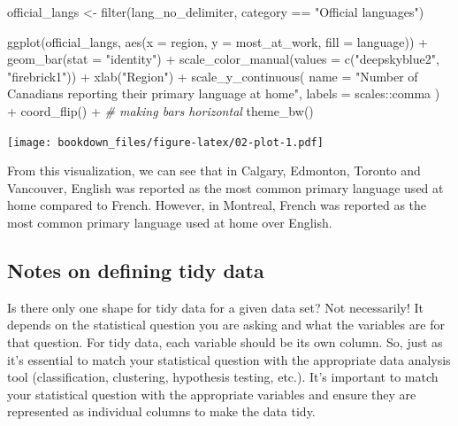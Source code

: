\documentclass[
]{krantz}
\makeatletter
\newenvironment{Shaded}{\begin{snugshade}}{\end{snugshade}}
\newcommand{\AttributeTok}[1]{\textcolor[rgb]{0.61,0.61,0.61}{#1}}
\newcommand{\CommentTok}[1]{\textcolor[rgb]{0.37,0.37,0.37}{\textit{#1}}}
\newcommand{\FunctionTok}[1]{\textcolor[rgb]{0,0,0}{#1}}
\newcommand{\NormalTok}[1]{#1}
\newcommand{\OtherTok}[1]{\textcolor[rgb]{0.37,0.37,0.37}{#1}}
\newcommand{\SpecialCharTok}[1]{\textcolor[rgb]{0,0,0}{#1}}
\newcommand{\StringTok}[1]{\textcolor[rgb]{0.5,0.5,0.5}{#1}}
\newenvironment{kframe}{%
\medskip{}
\setlength{\fboxsep}{.8em}
 \def\at@end@of@kframe{}%
 \ifinner\ifhmode%
  \def\at@end@of@kframe{\end{minipage}}%
  \begin{minipage}{\columnwidth}%
 \fi\fi%
 \def\FrameCommand##1{\hskip\@totalleftmargin \hskip-\fboxsep
 \colorbox{shadecolor}{##1}\hskip-\fboxsep
     \hskip-\linewidth \hskip-\@totalleftmargin \hskip\columnwidth}%
 \MakeFramed {\advance\hsize-\width
   \@totalleftmargin\z@ \linewidth\hsize
   \@setminipage}}%
 {\par\unskip\endMakeFramed%
 \at@end@of@kframe}
\renewenvironment{Shaded}{\begin{kframe}}{\end{kframe}}
\makeatother
\begin{document}
\begin{Shaded}
\begin{Highlighting}[]
\NormalTok{official\_langs }\OtherTok{\textless{}{-}} \FunctionTok{filter}\NormalTok{(lang\_no\_delimiter, category }\SpecialCharTok{==} \StringTok{"Official languages"}\NormalTok{)}

\FunctionTok{ggplot}\NormalTok{(official\_langs, }\FunctionTok{aes}\NormalTok{(}\AttributeTok{x =}\NormalTok{ region, }\AttributeTok{y =}\NormalTok{ most\_at\_work, }\AttributeTok{fill =}\NormalTok{ language)) }\SpecialCharTok{+}
  \FunctionTok{geom\_bar}\NormalTok{(}\AttributeTok{stat =} \StringTok{"identity"}\NormalTok{) }\SpecialCharTok{+}
  \FunctionTok{scale\_color\_manual}\NormalTok{(}\AttributeTok{values =} \FunctionTok{c}\NormalTok{(}\StringTok{"deepskyblue2"}\NormalTok{, }\StringTok{"firebrick1"}\NormalTok{)) }\SpecialCharTok{+}
  \FunctionTok{xlab}\NormalTok{(}\StringTok{"Region"}\NormalTok{) }\SpecialCharTok{+}
  \FunctionTok{scale\_y\_continuous}\NormalTok{(}
    \AttributeTok{name =} \StringTok{"Number of Canadians reporting their primary language at home"}\NormalTok{,}
    \AttributeTok{labels =}\NormalTok{ scales}\SpecialCharTok{::}\NormalTok{comma}
\NormalTok{  ) }\SpecialCharTok{+}
  \FunctionTok{coord\_flip}\NormalTok{() }\SpecialCharTok{+} \CommentTok{\# making bars horizontal}
  \FunctionTok{theme\_bw}\NormalTok{()}
\end{Highlighting}
\end{Shaded}

\texttt{[image: bookdown\_files/figure-latex/02-plot-1.pdf]}

From this visualization, we can see that in Calgary, Edmonton, Toronto and Vancouver, English was reported as the most common primary language used at home compared to French. However, in Montreal, French was reported as the most common primary language used at home over English.

\hypertarget{notes-on-defining-tidy-data}{%
\subsection{Notes on defining tidy data}\label{notes-on-defining-tidy-data}}

Is there only one shape for tidy data for a given data set? Not necessarily! It depends on the statistical question you are asking and what the variables are for that question. For tidy data, each variable should be its own column. So, just as it's essential to match your statistical question with the appropriate data analysis tool (classification, clustering, hypothesis testing, etc.). It's important to match your statistical question with the appropriate variables and ensure they are represented as individual columns to make the data tidy.
\end{document}
